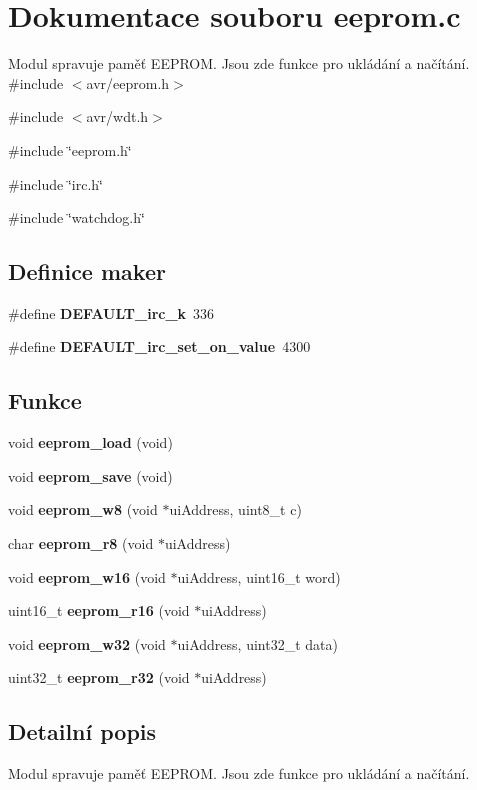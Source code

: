 \section{Dokumentace souboru eeprom.c}
\label{eeprom_8c}


Modul spravuje paměť EEPROM. Jsou zde funkce pro ukládání a načítání.  
{\ttfamily \#include $<$avr/eeprom.h$>$}\par
{\ttfamily \#include $<$avr/wdt.h$>$}\par
{\ttfamily \#include \char`\"{}eeprom.h\char`\"{}}\par
{\ttfamily \#include \char`\"{}irc.h\char`\"{}}\par
{\ttfamily \#include \char`\"{}watchdog.h\char`\"{}}\par
\subsection*{Definice maker}
\begin{DoxyCompactItemize}
\item 
\#define {\bf DEFAULT\_\-irc\_\-k}~336
\item 
\#define {\bf DEFAULT\_\-irc\_\-set\_\-on\_\-value}~4300
\end{DoxyCompactItemize}
\subsection*{Funkce}
\begin{DoxyCompactItemize}
\item 
void {\bf eeprom\_\-load} (void)
\item 
void {\bf eeprom\_\-save} (void)
\item 
void {\bf eeprom\_\-w8} (void $\ast$uiAddress, uint8\_\-t c)
\item 
char {\bf eeprom\_\-r8} (void $\ast$uiAddress)
\item 
void {\bf eeprom\_\-w16} (void $\ast$uiAddress, uint16\_\-t word)
\item 
uint16\_\-t {\bf eeprom\_\-r16} (void $\ast$uiAddress)
\item 
void {\bf eeprom\_\-w32} (void $\ast$uiAddress, uint32\_\-t data)
\item 
uint32\_\-t {\bf eeprom\_\-r32} (void $\ast$uiAddress)
\end{DoxyCompactItemize}


\subsection{Detailní popis}
Modul spravuje paměť EEPROM. Jsou zde funkce pro ukládání a načítání. 

